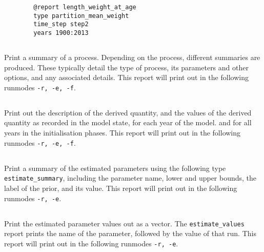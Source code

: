 {\small{\begin{verbatim}
		@report length_weight_at_age
		type partition_mean_weight
		time_step step2
		years 1900:2013
		\end{verbatim}}}

\subsection{}
Print a summary of a process. Depending on the process, different summaries are produced. These typically detail the type of process, its parameters and other options, and any associated details. This report will print out in the following runmodes \texttt{-r, -e, -f}.

\subsection{}

Print out the description of the derived quantity, and the values of the derived quantity as recorded in the model state, for each year of the model. and for all years in the  initialisation phases. This report will print out in the following runmodes \texttt{-r, -e, -f}.

\subsection{}

Print a summary of the estimated parameters using the following type \texttt{estimate\_summary}, including the parameter name, lower and upper bounds, the label of the prior, and its value. This report will print out in the following runmodes \texttt{-r, -e}.

\subsection{}

Print the estimated parameter values out as a vector. The \texttt{estimate\_values} report prints the name of the parameter, followed by the value of that run.  This report will print out in the following runmodes \texttt{-r, -e}.

\subsection{}

